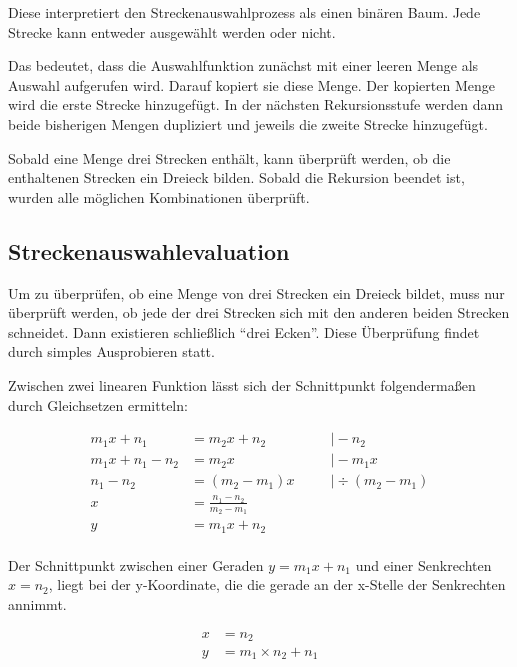 Diese interpretiert den Streckenauswahlprozess als einen binären Baum. Jede Strecke kann entweder ausgewählt werden oder nicht.

Das bedeutet, dass die Auswahlfunktion zunächst mit einer leeren Menge als Auswahl aufgerufen wird.
Darauf kopiert sie diese Menge.
Der kopierten Menge wird die erste Strecke hinzugefügt.
In der nächsten Rekursionsstufe werden dann beide bisherigen Mengen dupliziert und jeweils die zweite Strecke hinzugefügt.

Sobald eine Menge drei Strecken enthält, kann überprüft werden, ob die enthaltenen Strecken ein Dreieck bilden. Sobald die Rekursion beendet ist, wurden alle möglichen Kombinationen überprüft.

\subsection{Streckenauswahlevaluation}
Um zu überprüfen, ob eine Menge von drei Strecken ein Dreieck bildet, muss nur überprüft werden, ob jede der drei Strecken sich mit den anderen beiden Strecken schneidet.
Dann existieren schließlich "`drei Ecken"'. Diese Überprüfung findet durch simples Ausprobieren statt.

Zwischen zwei linearen Funktion lässt sich der Schnittpunkt folgendermaßen durch Gleichsetzen ermitteln:

\begin{equation}
    \begin{aligned}
        m_1x+n_1 &= m_2x+n_2             &&\quad\vert -n_2          \\
        m_1x+n_1-n_2 &= m_2x             &&\quad\vert -m_1x         \\
        n_1-n_2 &= (m_2-m_1)x            &&\quad\vert \div(m_2-m_1) \\
        x &= \frac{n_1-n_2}{m_2-m_1}                                \\
        y &= m_1x+n_2                                               \\
    \end{aligned}
    \label{eq:linearschnitt}
\end{equation}

Der Schnittpunkt zwischen einer Geraden \(y=m_1x+n_1\) und einer Senkrechten \(x=n_2\), liegt bei der y-Koordinate, die die gerade an der x-Stelle der Senkrechten annimmt. 

\begin{equation}
    \begin{aligned}
        x &= n_2                    \\
        y &= m_1 \times n_2 + n_1   \\
    \end{aligned}
    \label{eq:senkrechtschnitt}
\end{equation}

